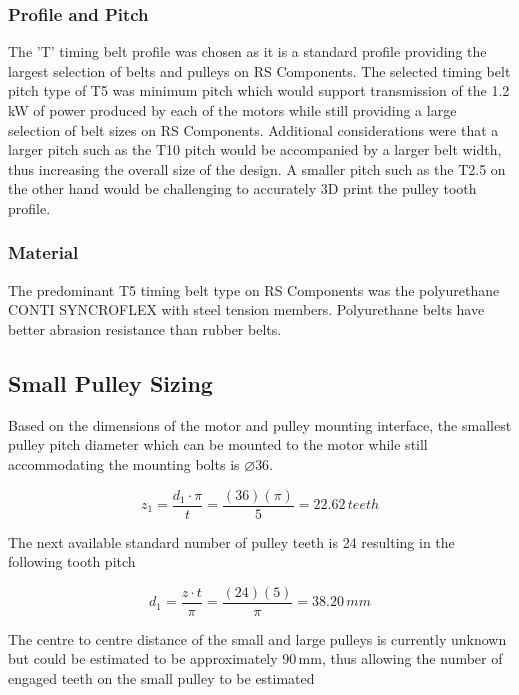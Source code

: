 \documentclass[11pt, titlepage]{article}
\begin{document}
\subsubsection{Profile and Pitch}
The 'T' timing belt profile was chosen as it is a standard profile providing the largest selection of belts and pulleys on RS Components.\newline
The selected timing belt pitch type of T5 was minimum pitch which would support transmission of the 1.2\,kW of power produced by each of the motors while still providing a large selection of belt sizes on RS Components. Additional considerations were that a larger pitch such as the T10 pitch would be accompanied by a larger belt width, thus increasing the overall size of the design. A smaller pitch such as the T2.5 on the other hand would be challenging to accurately 3D print the pulley tooth profile.

\subsubsection{Material}
The predominant T5 timing belt type on RS Components was the polyurethane CONTI SYNCROFLEX with steel tension members. Polyurethane belts have better abrasion resistance than rubber belts.

\newpage
\subsection{Small Pulley Sizing}
Based on the dimensions of the motor and pulley mounting interface, the smallest pulley pitch diameter which can be mounted to the motor while still accommodating the mounting bolts is $\diameter 36$.

\begin{equation}
	z_1 = \frac{d_1\cdot \pi}{t} = \frac{(36)(\pi)}{5} = 22.62\,teeth
\end{equation}

The next available standard number of pulley teeth  is 24 resulting in the following tooth pitch

\begin{equation}
	d_1 = \frac{z\cdot t}{\pi} = \frac{(24)(5)}{\pi} = 38.20\,mm	
\end{equation}

The centre to centre distance of the small and large pulleys is currently unknown but could be estimated to be approximately 90\,mm, thus allowing the number of engaged teeth on the small pulley to be estimated
\end{document}

